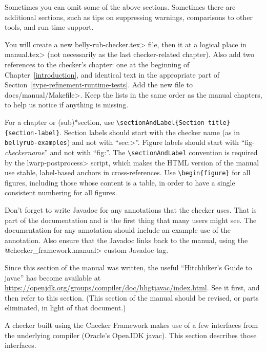 Sometimes you can omit some of the above sections.  Sometimes there are
additional sections, such as tips on suppressing warnings, comparisons to
other tools, and run-time support.

You will create a new \<belly-rub-checker.tex> file,
then \verb|| it at a logical place in \<manual.tex> (not
necessarily as the last checker-related chapter).  Also add two references
to the checker's chapter:  one at the beginning of
Chapter~\ref{introduction}, and identical text in the appropriate part of
Section~\ref{type-refinement-runtime-tests}.  Add the new file to
\<docs/manual/Makefile>.  Keep the lists in
the same order as the manual chapters, to help us notice if anything is
missing.

For a chapter or (sub)*section, use \verb|\sectionAndLabel{Section title}{section-label}|.
Section labels should start with the checker
name (as in \verb|bellyrub-examples|) and not with ``\<sec:>''.
Figure labels should start with ``fig-\emph{checkername}'' and not with ``fig:''.
The \verb|\sectionAndLabel| convention is required by the
\<lwarp-postprocess> script, which makes the HTML version of the manual use
stable, label-based anchors in cross-references.
Use \verb|\begin{figure}| for all figures, including those whose
content is a table, in order to have a single consistent numbering for all
figures.

Don't forget to write Javadoc for any annotations that the checker uses.
That is part of the documentation and is the first thing that many users
might see.  The documentation for any annotation should include an example
use of the annotation.
Also ensure that the Javadoc links back to the manual, using the
\<@checker\_framework.manual> custom Javadoc tag.



Since this section of the manual was written, the useful ``Hitchhiker's
Guide to javac'' has become available at
\url{https://openjdk.org/groups/compiler/doc/hhgtjavac/index.html}.
See it first, and then refer to this section.  (This section of the manual
should be revised, or parts eliminated, in light of that document.)


A checker built using the Checker Framework makes use of a few interfaces
from the underlying compiler (Oracle's OpenJDK javac).
This section describes those interfaces.




